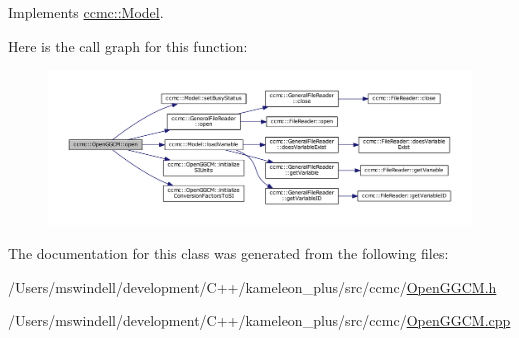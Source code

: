Implements \hyperlink{classccmc_1_1_model_a3c64dc635c2c1a2fe2f8efa2a3666282}{ccmc\-::\-Model}.



Here is the call graph for this function\-:
\nopagebreak
\begin{figure}[H]
\begin{center}
\leavevmode
\includegraphics[width=350pt]{classccmc_1_1_open_g_g_c_m_a899907309758135dbabc0d3c7b465900_cgraph}
\end{center}
\end{figure}




The documentation for this class was generated from the following files\-:\begin{DoxyCompactItemize}
\item 
/\-Users/mswindell/development/\-C++/kameleon\-\_\-plus/src/ccmc/\hyperlink{_open_g_g_c_m_8h}{Open\-G\-G\-C\-M.\-h}\item 
/\-Users/mswindell/development/\-C++/kameleon\-\_\-plus/src/ccmc/\hyperlink{_open_g_g_c_m_8cpp}{Open\-G\-G\-C\-M.\-cpp}\end{DoxyCompactItemize}
